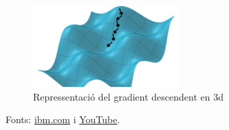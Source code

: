 \begin{enumerate}
\begin{itemize}
           \begin{figure}[H]
            \centering
            \includegraphics[width=0.5\textwidth]{./figures/gradient_descendent3d.png}
            \caption{Repressentació del gradient descendent en 3d}
            \end{figure}

            Fonts: \href{https://www.ibm.com/es-es/think/topics/gradient-descent}{ibm.com} i \href{https://www.youtube.com/watch?v=A6FiCDoz8_4&ab_channel=DotCSV}{YouTube}.
        \end{itemize}


\end{enumerate}
